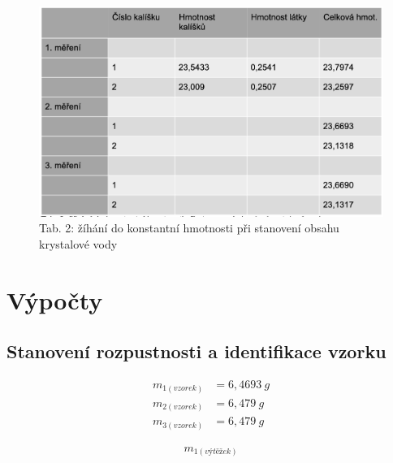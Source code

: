 \documentclass[13pt, a4paper, twoside]{article}
\begin{document}
\begin{figure}[H]
    \centering
    \includegraphics[width=6.8in]{tab_uloha10_3.png}
    \caption*{Tab. 2: žíhání do konstantní hmotnosti při stanovení obsahu krystalové vody}
\end{figure}

\section*{Výpočty}
\subsection*{Stanovení rozpustnosti a identifikace vzorku}
\begin{align*}
    m_{1(vzorek)}&=6,4693\: g\\
    m_{2(vzorek)}&= 6,479\: g\\
    m_{3(vzorek)}&= 6,479\: g
\end{align*}

\begin{align*}
    m_{1(výtěžek)}
\end{align*}
\end{document}
